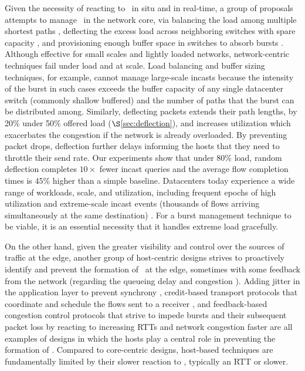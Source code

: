 Given the necessity of reacting to \bursts \ in situ and in real-time, a group of proposals attempts to manage \bursts \ in the network core, \eg via  balancing the load among multiple shortest paths \cite{drill}, deflecting the excess load across neighboring switches with spare capacity \cite{dibs, pabo}, and provisioning enough buffer space in switches to absorb bursts \cite{bufferFacebook}. Although effective for small scales and lightly loaded networks, network-centric techniques fail under load and at scale. Load balancing and buffer sizing techniques, for example, cannot manage large-scale incasts because the intensity of the burst in such cases exceeds the buffer capacity of any single datacenter switch (commonly shallow buffered) and the number of paths that the burst can be distributed among. Similarly, deflecting packets extends their path lengths, \eg by 20\% under 50\% offered load ($\S$\ref{sec:deflection}), and increases utilization which exacerbates the congestion if the network is already overloaded. By preventing packet drops, deflection further delays informing the hosts that they need to throttle their send rate. Our experiments show that under 80\% load, random deflection completes $10\times$ fewer incast queries and the average flow completion times is $45\%$ higher than a simple baseline. 
Datacenters today experience a wide range of workloads, scale, and utilization, including frequent epochs of high utilization and extreme-scale incast events (thousands of flows arriving simultaneously at the same destination) \cite{nature, swift, hpcc}. For a burst management technique to be viable, it is an essential necessity that it handles extreme load gracefully.

On the other hand, given the greater visibility and control over the sources of traffic at the edge, another group of host-centric designs strives to proactively identify and prevent the formation of \bursts \ at the edge, sometimes with some feedback from the network (\eg regarding the queueing delay \cite{hpcc} and congestion \cite{dctcp}). Adding jitter in the application layer to prevent synchrony \cite{jitter}, credit-based transport protocols that coordinate and schedule the flows sent to a receiver \cite{pHost, NDP, homa}, and feedback-based congestion control protocols that strive to impede bursts and their subsequent packet loss by reacting to increasing RTTs and network congestion faster \cite{dctcp, SECN, hpcc, swift} are all examples of designs in which the hosts play a central role in preventing the formation of \bursts. Compared to core-centric designs, host-based techniques are fundamentally limited by their slower reaction to \bursts, typically an RTT or slower.
%

